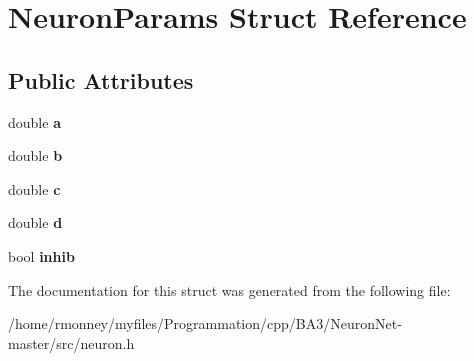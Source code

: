 \hypertarget{structNeuronParams}{}\section{Neuron\+Params Struct Reference}
\label{structNeuronParams}
\subsection*{Public Attributes}
\begin{DoxyCompactItemize}
\item 
\mbox{\label{structNeuronParams_a359703733f5e70bbd67d019e45a3bc85}} 
double {\bfseries a}
\item 
\mbox{\label{structNeuronParams_abd1bd37179d8efa115a8749f9252f77d}} 
double {\bfseries b}
\item 
\mbox{\label{structNeuronParams_a5df2ced2526eb84af2c8d2d34d9bfd93}} 
double {\bfseries c}
\item 
\mbox{\label{structNeuronParams_af2bd3bad3bc5532186cdc8d056a10cfb}} 
double {\bfseries d}
\item 
\mbox{\label{structNeuronParams_a751856d77a821cbd361b774d8653bbe6}} 
bool {\bfseries inhib}
\end{DoxyCompactItemize}


The documentation for this struct was generated from the following file\+:\begin{DoxyCompactItemize}
\item 
/home/rmonney/myfiles/\+Programmation/cpp/\+B\+A3/\+Neuron\+Net-\/master/src/neuron.\+h\end{DoxyCompactItemize}
